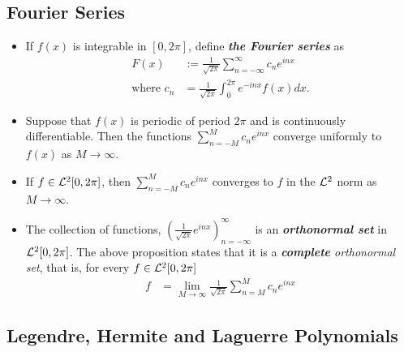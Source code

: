 \documentclass[11pt]{article}
\begin{document}
\subsection{Fourier Series}
\begin{itemize}
\item \begin{definition}
If $f(x)$ is  integrable in $[0, 2\pi]$, define \emph{\textbf{the Fourier series}} as 
\begin{align*}
F(x) &:= \frac{1}{\sqrt{2\pi}}\sum_{n=-\infty}^{\infty}c_n e^{i n x} \\
\text{where }c_n &= \frac{1}{\sqrt{2\pi}}\int_{0}^{2\pi} e^{-i n x} f(x) dx.
\end{align*}
\end{definition}

\item \begin{proposition}
Suppose that $f(x)$ is periodic of period $2\pi$ and is continuously differentiable. Then the functions $\sum_{n=-M}^{M}c_n e^{i n x}$ converge uniformly
to $f(x)$ as $M \rightarrow \infty$.
\end{proposition}

\item \begin{proposition}
If $f \in {\mathcal L}^2[0, 2\pi]$, then $\sum_{n=-M}^{M}c_n e^{i n x}$ converges to $f$ in the ${\mathcal L}^2$ norm as $M \rightarrow \infty$.
\end{proposition}

\item \begin{remark}
The collection of functions, $(\frac{1}{\sqrt{2\pi}}e^{i n x})_{n=-\infty}^{\infty}$ is an \emph{\textbf{orthonormal set}} in ${\mathcal L}^2[0, 2\pi]$. The above proposition states that it is a \emph{\textbf{complete} orthonormal set}, that is, for every $f \in {\mathcal L}^2[0, 2\pi]$
\begin{align*}
f &= \lim\limits_{M\rightarrow \infty}\frac{1}{\sqrt{2\pi}}\sum_{n=M}^{M}c_n e^{i n x}
\end{align*}
\end{remark}
\end{itemize}

\subsection{Legendre, Hermite and Laguerre Polynomials}
\end{document}
